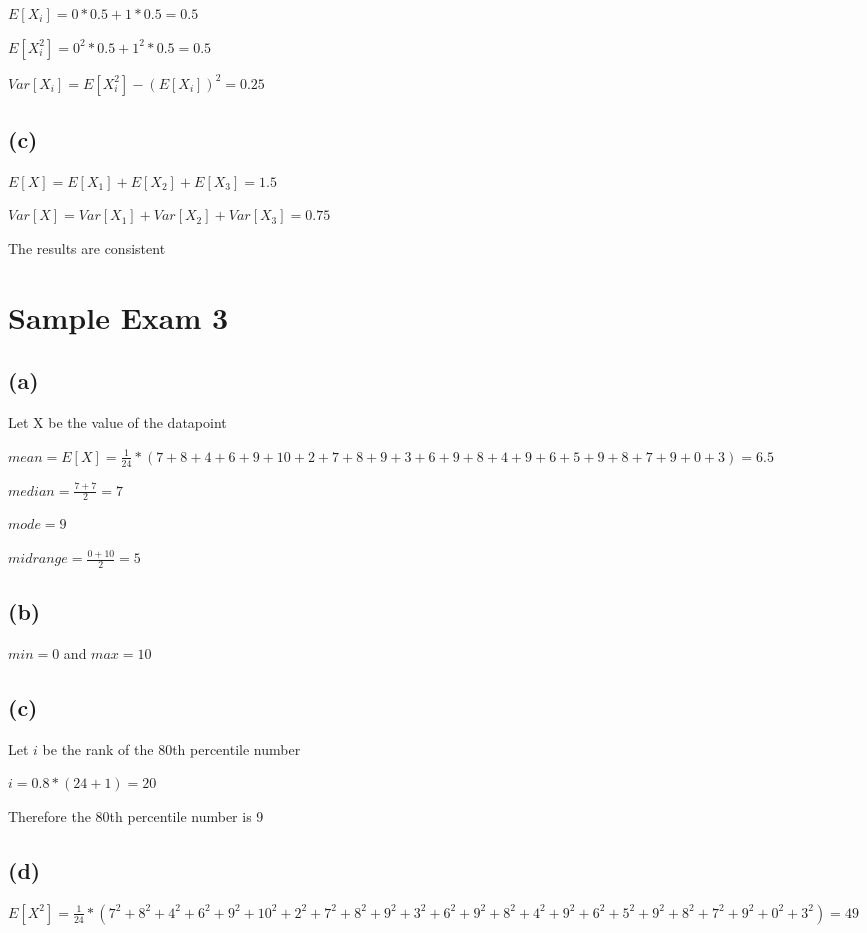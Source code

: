 \documentclass[12pt]{article}
\begin{document}
\begin{spacing}{2.0}
$E[X_i]=0*0.5+1*0.5=0.5$

$E[X_i^2]= 0^2*0.5+1^2*0.5=0.5$

$Var[X_i]=E[X_i^2]-(E[X_i])^2= 0.25$

\subsection*{(c)}

$E[X]=E[X_1]+E[X_2] +E[X_3]= 1.5$

$Var[X]=Var[X_1]+Var[X_2] +Var[X_3]= 0.75$

The results are consistent

\section*{Sample Exam 3}

\subsection*{(a)}

Let X be the value of the datapoint

$mean=E[X]=\frac{1}{24}*(7+ 8+ 4+ 6+ 9+ 10+ 2+ 7+ 8+ 9+ 3+ 6+ 9+ 8+ 4+ 9+ 6+ 5+ 9+ 8+ 7+ 9+ 0+ 3)= 6.5$

$median=\frac{7+7}{2}=7$

$mode= 9$

$midrange=\frac{0+10}{2}=5$

\subsection*{(b)}

$min=0$ and $max=10$

\subsection*{(c)}

Let $i$ be the rank of the 80th percentile number

$i=0.8*(24+1)=20$

Therefore the 80th percentile number is 9

\subsection*{(d)}

$E[X^2]= \frac{1}{24}*(7^2+ 8^2+ 4^2+ 6^2+ 9^2+ 10^2+ 2^2+ 7^2+ 8^2+ 9^2+ 3^2+ 6^2+ 9^2+ 8^2+ 4^2+ 9^2+ 6^2+ 5^2+ 9^2+ 8^2+ 7^2+ 9^2+ 0^2+ 3^2)= 49$


\end{spacing}
\end{document}

